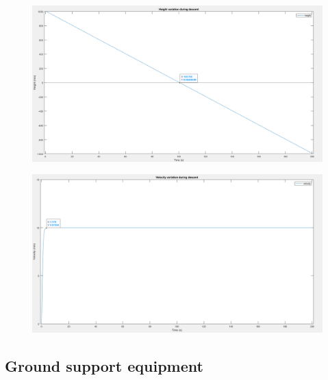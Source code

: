 \documentclass[11pt]{article}
\begin{document}
\begin{enumerate}
\begin{figure}[hbt!]
\includegraphics[width=15cm]{Height_variation}
\centering
\end{figure}

\begin{figure}[hbt!]
\includegraphics[width=15cm]{Velocity_variation}
\centering
\end{figure}

\end{enumerate}

\subsection{Ground support equipment}


\end{document}
